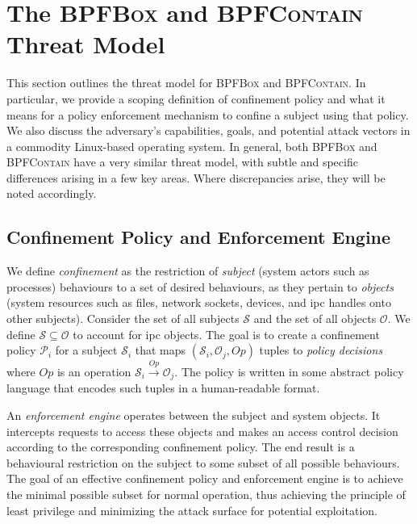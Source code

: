 \documentclass[
  fontsize=12pt,
  titlepage=firstiscover,
  paper=letter,
oneside,
  cleardoublepage=plain,
  parskip=half-,
  DIV=10,
  parindent,
  appendixprefix,
  chapterprefix,
  listof=totoc,
]{scrbook}
\newcommand{\bpfbox}{\textsc{BPFBox}}
\newcommand{\bpfcontain}{\textsc{BPFContain}}
\begin{document}
\section{The \bpfbox{} and \bpfcontain{} Threat Model}\label{s:cp-threat-model}

This section outlines the threat model for \bpfbox{} and \bpfcontain{}. In particular, we
provide a scoping definition of confinement policy and what it means for a policy
enforcement mechanism to confine a subject using that policy. We also discuss the
adversary's capabilities, goals, and potential attack vectors in a commodity Linux-based
operating system. In general, both \bpfbox{} and \bpfcontain{} have a very similar threat
model, with subtle and specific differences arising in a few key areas. Where
discrepancies arise, they will be noted accordingly.

\subsection{Confinement Policy and Enforcement Engine}

We define \textit{confinement} as the restriction of \textit{subject} (system actors such
as processes) behaviours to a set of desired behaviours, as they pertain to
\textit{objects} (system resources such as files, network sockets, devices, and \gls{ipc}
handles onto other subjects). Consider the set of all subjects $\mathcal{S}$ and the set
of all objects $\mathcal{O}$. We define $\mathcal{S} \subseteq \mathcal{O}$ to account for
\gls{ipc} objects. The goal is to create a confinement policy $\mathcal{P}_i$ for a subject
$\mathcal{S}_i$ that maps $(\mathcal{S}_i, \mathcal{O}_j, Op)$ tuples to \textit{policy
decisions} where $Op$ is an operation $\mathcal{S}_i \xrightarrow{Op} \mathcal{O}_j$.  The
policy is written in some abstract policy language that encodes such tuples in
a human-readable format.

An \textit{enforcement engine} operates between the subject and system objects. It
intercepts requests to access these objects and makes an access control decision according
to the corresponding confinement policy. The end result is a behavioural restriction on
the subject to some subset of all possible behaviours. The goal of an effective
confinement policy and enforcement engine is to achieve the minimal possible subset for
normal operation, thus achieving the principle of least privilege and minimizing the
attack surface for potential exploitation.
\end{document}
